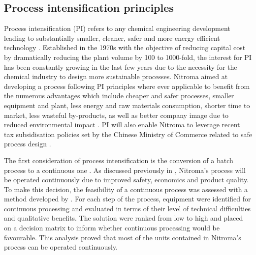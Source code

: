 \subsection{Process intensification principles}

Process intensification (PI) refers to any chemical engineering development leading to substantially smaller, cleaner, safer and more energy efficient technology \cite{reay_chapter_2008}. Established in the 1970s with the objective of reducing capital cost by dramatically reducing the plant volume by 100 to 1000-fold, the interest for PI has been constantly growing in the last few years due to the necessity for the chemical industry to design more sustainable processes. Nitroma aimed at developing a process following PI principles where ever applicable to benefit from the numerous advantages which include cheaper and safer processes, smaller equipment and plant, less energy and raw materials consumption, shorter time to market, less wasteful by-products, as well as better company image due to reduced environmental impact \cite{reay_chapter_2008}. PI will also enable Nitroma to leverage recent tax subsidisation policies set by the Chinese Ministry of Commerce related to safe process design \cite{nanjing_economic_and_technological_development_zone_administration_committee_public_2019}.  

The first consideration of process intensification is the conversion of a batch process to a continuous one \cite{randall_process_2020}. As discussed previously in , Nitroma's process will be operated continuously due to improved safety, economics and product quality. To make this decision, the feasibility of a continuous process was assessed with a method developed by \textcite{}. For each step of the process, equipment were  identified for continuous processing and evaluated in terms of their level of technical difficulties and qualitative benefits. The solution were ranked from low to high and placed on a decision matrix to inform whether continuous processing would be favourable. This analysis proved that most of the units contained in Nitroma's process can be operated continuously.

